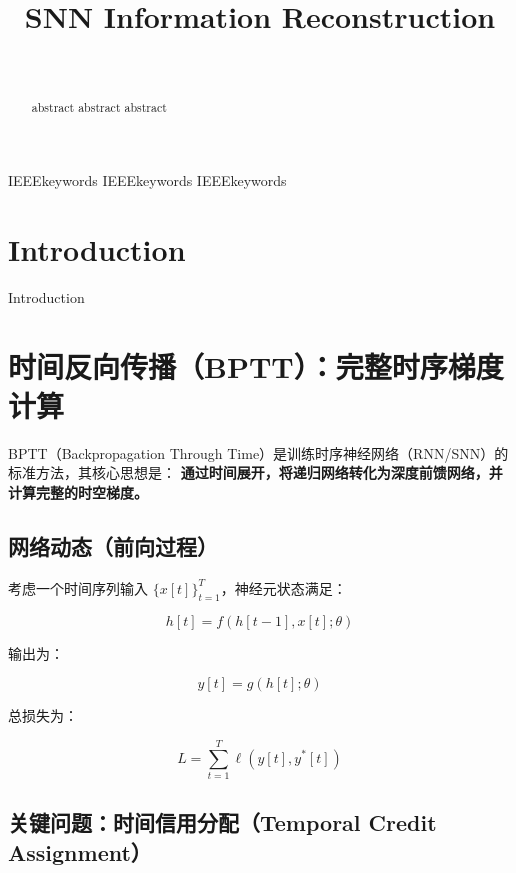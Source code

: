 \documentclass[journal,12pt,onecolumn]{IEEEtran}
\begin{document}
\title{SNN Information Reconstruction}
\author{
\\
}

\maketitle

\begin{abstract}
  abstract abstract abstract
\\ 
\end{abstract}
\begin{IEEEkeywords}


  IEEEkeywords IEEEkeywords IEEEkeywords
	
\end{IEEEkeywords}

\let\thefootnote\relax


\section{Introduction}
Introduction 

\cite{apolinario2025tess}



\section{时间反向传播（BPTT）：完整时序梯度计算}

BPTT（Backpropagation Through Time）是训练时序神经网络（RNN/SNN）的标准方法，其核心思想是：
\textbf{通过时间展开，将递归网络转化为深度前馈网络，并计算完整的时空梯度。}

\subsection{网络动态（前向过程）}

考虑一个时间序列输入 $\{x[t]\}_{t=1}^T$，神经元状态满足：

\[
h[t] = f(h[t-1], x[t]; \theta)
\]

输出为：

\[
y[t] = g(h[t]; \theta)
\]

总损失为：

\[
L = \sum_{t=1}^{T} \ell(y[t], y^*[t])
\]

\subsection{关键问题：时间信用分配（Temporal Credit Assignment）}
\end{document}

